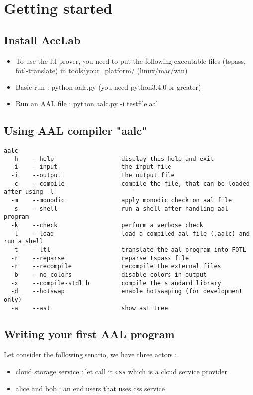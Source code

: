 \section{Getting started}

\subsection{Install AccLab}
\begin{itemize}
  \item To use the ltl prover, you need to put the following executable files (tspass, fotl-translate) in tools/your\_platform/ (linux/mac/win)
  \item Basic run : python aalc.py (you need python3.4.0 or greater)
  \item Run an AAL file : python aalc.py -i testfile.aal
\end{itemize}


\subsection{Using AAL compiler "aalc"}
{
\lstset{style=shell}
\begin{lstlisting}[caption={aalc options}]
aalc 
  -h    --help                   display this help and exit
  -i    --input                  the input file
  -i    --output                 the output file
  -c    --compile                compile the file, that can be loaded after using -l
  -m    --monodic                apply monodic check on aal file
  -s    --shell                  run a shell after handling aal program
  -k    --check                  perform a verbose check
  -l    --load                   load a compiled aal file (.aalc) and run a shell
  -t    --ltl                    translate the aal program into FOTL
  -r    --reparse                reparse tspass file
  -r    --recompile              recompile the external files
  -b    --no-colors              disable colors in output
  -x    --compile-stdlib         compile the standard library
  -d    --hotswap                enable hotswaping (for development only)
  -a    --ast                    show ast tree
\end{lstlisting}
}

\subsection{Writing your first AAL program}
Let consider the following senario, we have three actors :
\begin{itemize}
    \item cloud storage service : let call it \texttt{css} which is a cloud service provider
    \item alice and bob : an end users that uses css service
\end{itemize}

